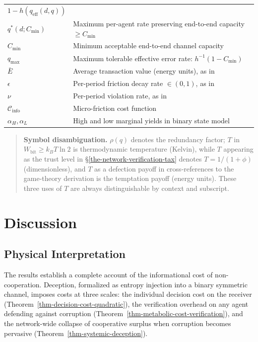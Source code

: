 \documentclass[11pt]{article}
\theoremstyle{plain}
\theoremstyle{definition}
\theoremstyle{remark}
\let\origsection\section
\renewcommand{\section}{\needspace{12\baselineskip}\origsection}
\let\origsubsection\subsection
\renewcommand{\subsection}{\needspace{7\baselineskip}\origsubsection}
\begin{document}
{\begin{longtable}[]{@{}
  >{\raggedright\arraybackslash}p{}
  >{\raggedright\arraybackslash}p{}@{}}
\(1 - h(q_{\text{eff}}(d, q))\) \\
\(q^*(d; C_{\min})\) & Maximum per-agent rate preserving end-to-end
capacity \(\geq C_{\min}\) \\
\(C_{\min}\) & Minimum acceptable end-to-end channel capacity \\
\(q_{\max}\) & Maximum tolerable effective error rate:
\(h^{-1}(1 - C_{\min})\) \\
\(\bar{E}\) & Average transaction value (energy units), as in
\citep{TC-IV} \\
\(\epsilon\) & Per-period friction decay rate \(\in (0,1)\), as in
\citep{TC-IV} \\
\(\nu\) & Per-period violation rate, as in \citep{TC-IV} \\
\(\mathcal{C}_{\text{info}}\) & Micro-friction cost function \\
\(\alpha_H, \alpha_L\) & High and low marginal yields in binary state
model \\
\end{longtable}
}

\begin{quote}
\textbf{Symbol disambiguation.} \(\rho(q)\) denotes the redundancy
factor; \(T\) in \(W_{\text{bit}} \geq k_B T \ln 2\) is thermodynamic
temperature (Kelvin), while \(T\) appearing as the trust level in
§\ref{the-network-verification-tax} denotes \(T = 1/(1+\phi)\)
(dimensionless), and \(T\) as a defection payoff in cross-references to
the game-theory derivation \citep{TC-V} is the temptation payoff (energy
units). These three uses of \(T\) are always distinguishable by context
and subscript.
\end{quote}

\section{Discussion}\label{discussion}

\subsection{Physical Interpretation}\label{physical-interpretation}

The results establish a complete account of the informational cost of
non-cooperation. Deception, formalized as entropy injection into a
binary symmetric channel, imposes costs at three scales: the individual
decision cost on the receiver
(Theorem~\ref{thm-decision-cost-quadratic}), the verification overhead
on any agent defending against corruption
(Theorem~\ref{thm-metabolic-cost-verification}), and the network-wide
collapse of cooperative surplus when corruption becomes pervasive
(Theorem~\ref{thm-systemic-deception}).
\end{document}
